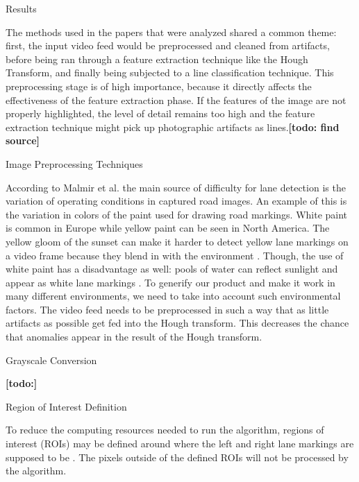 \documentclass{matthijs}
\begin{document}
	\begin{hoofdstuk}{Results}

		The methods used in the papers that were analyzed shared a common theme: first, the input video feed would be preprocessed and cleaned from artifacts, before being ran through a feature extraction technique like the Hough Transform, and finally being subjected to a line classification technique.
		This preprocessing stage is of high importance, because it directly affects the effectiveness of the feature extraction phase.
		If the features of the image are not properly highlighted, the level of detail remains too high and the feature extraction technique might pick up photographic artifacts as lines.\textbf{[todo: find source]}

		\begin{paragraaf}{Image Preprocessing Techniques}

			According to Malmir et al. \cite{malmir2019design} the main source of difficulty for lane detection is the variation of operating conditions in captured road images.
			An example of this is the variation in colors of the paint used for drawing road markings.
			White paint is common in Europe while yellow paint can be seen in North America.
			The yellow gloom of the sunset can make it harder to detect yellow lane markings on a video frame because they blend in with the environment \cite{tumasov2021research}.
			Though, the use of white paint has a disadvantage as well: pools of water can reflect sunlight and appear as white lane markings \cite{krine2021road}.
			To generify our product and make it work in many different environments, we need to take into account such environmental factors.
			The video feed needs to be preprocessed in such a way that as little artifacts as possible get fed into the Hough transform.
			This decreases the chance that anomalies appear in the result of the Hough transform.
			
			\begin{subparagraaf}{Grayscale Conversion}

				\textbf{[todo:]}
			
			\end{subparagraaf}

			\begin{subparagraaf}{Region of Interest Definition}

				To reduce the computing resources needed to run the algorithm, regions of interest (ROIs) may be defined around where the left and right lane markings are supposed to be \cite{el2020novel}.
				The pixels outside of the defined ROIs will not be processed by the algorithm.
				

\end{subparagraaf}
\end{paragraaf}
\end{hoofdstuk}
\end{document}
